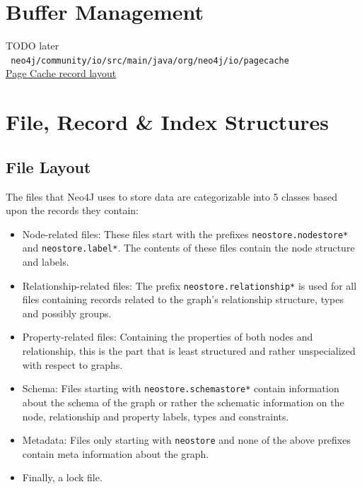 \documentclass[a4paper,10pt]{article}
\begin{document}
\section{Buffer Management}
TODO later \\
\texttt{
neo4j/community/io/src/main/java/org/neo4j/io/pagecache
} \\
\href{https://www.slideshare.net/thobe/an-overview-of-neo4j-internals}{Page Cache record layout} \\

 \newpage
 
 
\section{File, Record \& Index Structures}
\subsection{File Layout}
The files that Neo4J uses to store data are categorizable into 5 classes based upon the records they contain:
\begin{itemize}
 \item Node-related files: These files start with the prefixes \texttt{neostore.nodestore*} and \texttt{neostore.label*}. The contents of these files contain the node structure and labels. 
 \item Relationship-related files: The prefix \texttt{neostore.relationship*} is used for all files containing records related to the graph's relationship structure, types and possibly groups.
 \item Property-related files: Containing the properties of both nodes and relationship, this is the part that is least structured and rather unspecialized with respect to graphs.
 \item Schema: Files starting with \texttt{neostore.schemastore*} contain information about the schema of the graph or rather the schematic information on the node, relationship and property labels, types and constraints.
 \item Metadata: Files only starting with \texttt{neostore} and none of the above prefixes contain meta information about the graph.
 \item Finally, a lock file.
\end{itemize}
\end{document}
